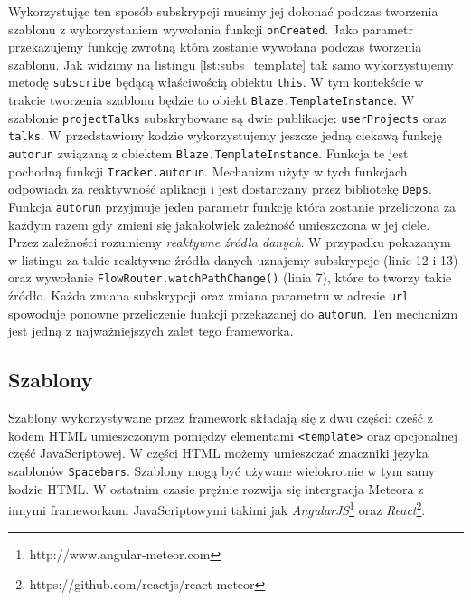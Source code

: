 Wykorzystując ten sposób subskrypcji musimy jej dokonać podczas tworzenia szablonu z wykorzystaniem wywołania funkcji \verb|onCreated|. Jako parametr przekazujemy funkcję zwrotną która zostanie wywołana podczas tworzenia szablonu. Jak widzimy na listingu \ref{lst:subs_template} tak samo wykorzystujemy metodę \verb|subscribe| będącą właściwością obiektu \verb|this|. W tym kontekście w trakcie tworzenia szablonu będzie to obiekt \linebreak \verb|Blaze.TemplateInstance|. W szablonie \verb|projectTalks| subskrybowane są dwie publikacje: \verb|userProjects| oraz \verb|talks|. W przedstawiony kodzie wykorzystujemy jeszcze jedną ciekawą funkcję \verb|autorun| związaną z obiektem \verb|Blaze.TemplateInstance|. Funkcja te jest pochodną funkcji \verb|Tracker.autorun|. Mechanizm użyty w tych funkcjach odpowiada za reaktywność aplikacji i jest dostarczany przez bibliotekę \verb|Deps|. Funkcja \verb|autorun| przyjmuje jeden parametr funkcję która zostanie przeliczona za każdym razem gdy zmieni się jakakolwiek zależność umieszczona w jej ciele. Przez zależności rozumiemy \textit{reaktywne źródła danych}. W przypadku pokazanym w listingu za takie reaktywne źródła danych uznajemy subskrypcje (linie 12 i 13) oraz wywołanie \linebreak\verb|FlowRouter.watchPathChange()| (linia 7), które to tworzy takie źródło. Każda zmiana subskrypcji oraz zmiana parametru w adresie \verb|url| spowoduje ponowne przeliczenie funkcji przekazanej do \verb|autorun|. Ten mechanizm jest jedną z najważniejszych zalet tego frameworka.

  \subsection{Szablony}
Szablony wykorzystywane przez framework składają się z dwu części: cześć z kodem HTML umieszczonym pomiędzy elementami \verb|<template>| oraz opcjonalnej część JavaScriptowej. W części HTML możemy umieszczać znaczniki języka szablonów \verb|Spacebars|. Szablony mogą być używane wielokrotnie w tym samy kodzie HTML. W ostatnim czasie prężnie rozwija się intergracja Meteora z innymi frameworkami JavaScriptowymi takimi jak \emph{AngularJS}\footnote{http://www.angular-meteor.com} oraz \emph{React}\footnote{https://github.com/reactjs/react-meteor}. 
